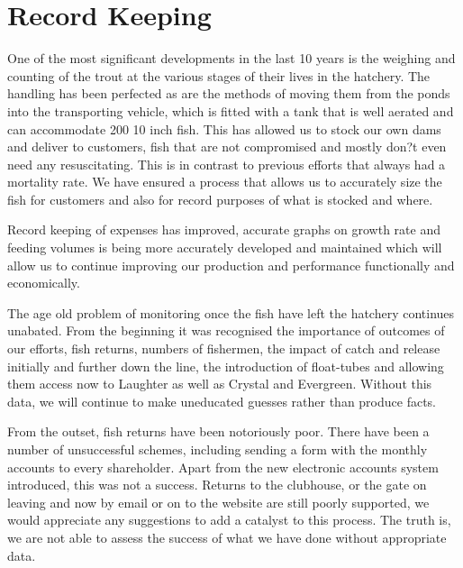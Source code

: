 \section{Record Keeping}

One of the most significant developments in the last 10 years is the weighing and counting of the trout at the various stages of 
their lives in the hatchery. The handling has been perfected as are the methods of moving them from the ponds into the 
transporting vehicle, which is fitted with a tank that is well aerated and can accommodate 200 10 inch fish. 
This has allowed us to stock our own dams and deliver to customers, fish that are not compromised and mostly 
don?t even need any resuscitating. This is in contrast to previous efforts that always had a mortality rate. 
We have ensured a process that allows us to accurately size the fish for customers and also for record 
purposes of what is stocked and where.

 Record keeping of expenses has improved, accurate graphs on growth rate and feeding volumes is being 
 more accurately developed and maintained which will allow us to continue improving our production and 
 performance functionally and economically.
 
 The age old problem of monitoring once the fish have left the hatchery continues unabated. 
 From the beginning it was recognised the importance of outcomes of our efforts, fish returns, numbers of 
fishermen, the impact of catch and release initially and further down the line, 
the introduction of float-tubes and allowing them access now to Laughter as well as Crystal and Evergreen. 
Without this data, we will continue to make uneducated guesses rather than produce facts.

From the outset, fish returns have been notoriously poor. There have been a number of unsuccessful schemes, 
including sending a form with the monthly accounts to every shareholder. Apart from the new electronic accounts system 
introduced, this was not a success. Returns to the clubhouse, or the gate on leaving and now by email or on to the website 
are still poorly supported, we would appreciate any suggestions to add a catalyst to this process. 
The truth is, we are not able to assess the success of what we have done without appropriate data.


